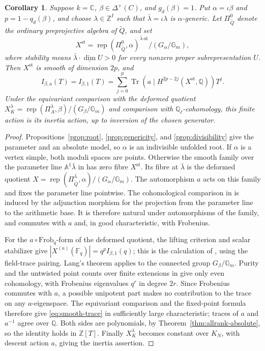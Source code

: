 \documentclass[11pt, reqno]{amsart}
\numberwithin{equation}{section}
\newtheorem{corollary}[theorem]{Corollary}
\theoremstyle{definition}
\theoremstyle{remark}
\newcommand{\op}[1]{\operatorname{#1}}
\newcommand{\mr}[1]{\mathrm{#1}}
\newcommand{\mb}[1]{\mathbb{#1}}
\newcommand{\dimv}{\underline{\dim}}
\newcommand{\Tr}{\op{Tr}}
\newcommand{\Rep}{\op{rep}}
\newcommand{\Qbar}{\widetilde Q}
\begin{document}
\begin{corollary}\label{cor:smooth-trace}
Suppose $k=\mb C$, $\beta\in\Delta^+(C)$, and $g_d(\beta)=1$.
Put $\alpha=\iota\beta$ and $p=1-q_d(\beta)$, and choose
$\lambda\in\mb Z^I$ such that $\bar\lambda=\iota\lambda$ is
$\alpha$-generic. Let $\Pi^0_{\Qbar}$ denote the ordinary preprojective algebra of
$\Qbar$, and set
\[ X^{\mr{st}}= \Rep(\Pi^0_{\Qbar},\alpha)^{\bar\lambda\text{-}\mr{st}} /(G_\alpha/\mb G_m), \]
where stability means $\bar\lambda\cdot\dimv U>0$ for every nonzero
proper subrepresentation $U$. Then $X^{\mr{st}}$ is smooth of
dimension $2p$, and
\begin{equation}\label{eq:smooth-trace} I_{\beta,a}(T)=I_{\beta,1}(T) =\sum_{j=0}^{p} \Tr\!\left(a\mid H^{2p-2j}(X^{\mr{st}},\mb Q)\right)T^j.\end{equation}
Under the equivariant comparison with the deformed quotient
$X_K^\lambda=\Rep(\Pi_A^\lambda,\beta)/(G_\beta/\mb G_m)$ and
comparison with $\mb Q_\ell$-cohomology, this finite action is its
inertia action, up to inversion of the chosen generator.
\end{corollary}
\begin{proof}
Propositions~\ref{prop:root}, \ref{prop:genericity}, and
\ref{prop:divisibility} give the parameter and an absolute model,
so $\alpha$ is an indivisible unfolded root. If $\alpha$ is a vertex
simple, both moduli spaces are points. Otherwise the smooth family
over the parameter line
$\mb A^1\bar\lambda$ in \cite[Section~2.1]{CBVdB} has zero
fibre $X^{\mr{st}}$. Its fibre at $\bar\lambda$ is the deformed
quotient $X=\Rep(\Pi^{\bar\lambda}_{\Qbar},\alpha)/(G_\alpha/\mb G_m)$.
The automorphism $a$ acts on this family and fixes the parameter line
pointwise. The cohomological comparison in
\cite[Proposition~2.3.1 and Corollary~2.3.2]{CBVdB} is induced by the adjunction morphism for the projection from the
parameter line to the arithmetic base. It is therefore natural under
automorphisms of the family, and commutes with $a$ and, in good
characteristic, with Frobenius.

For the $a\circ\mr{Frob}_q$-form of the deformed quotient, the
lifting criterion and scalar stabilizer give
$|X^{(a)}(\mb F_q)|=q^p I_{\beta,1}(q)$; this is the calculation
of \cite[Proposition~2.2.1]{CBVdB}, using the field-trace pairing.
Lang's theorem applies to the connected group $G_\beta/\mb G_m$.
Purity and the untwisted point counts over finite extensions in
\cite[Section~2.4]{CBVdB} give only even cohomology, with Frobenius
eigenvalues $q^r$ in degree $2r$. Since Frobenius commutes with $a$, a possible unipotent part makes no
contribution to the trace on any $a$-eigenspace. The equivariant
comparison and the fixed-point formula therefore give
\eqref{eq:smooth-trace} in
sufficiently large characteristic; traces of $a$ and $a^{-1}$ agree
over $\mb Q$. Both sides are polynomials, by
Theorem~\ref{thm:allrank-absolute}, so the identity holds in
$\mb Z[T]$. Finally $X_K^\lambda$ becomes constant over $K_N$,
with descent action $a$, giving the inertia assertion.
\end{proof}
\end{document}
